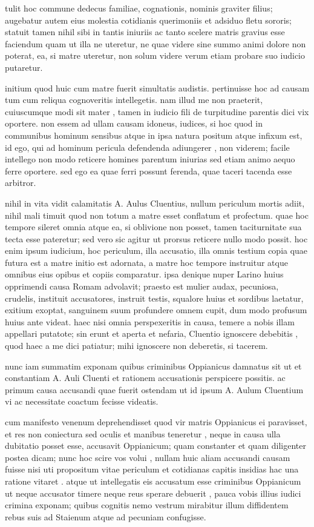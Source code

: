 tulit hoc commune dedecus familiae, cognationis, nominis graviter filius; augebatur autem eius molestia cotidianis querimoniis et adsiduo fletu sororis; statuit tamen nihil sibi in tantis iniuriis ac tanto scelere matris gravius esse faciendum quam ut illa ne uteretur, ne quae videre sine summo animi dolore non poterat, ea, si matre uteretur, non solum videre verum etiam probare suo iudicio putaretur.

 initium quod huic cum matre fuerit simultatis audistis. pertinuisse hoc ad causam tum cum reliqua cognoveritis intellegetis. nam illud me non praeterit, cuiuscumque modi sit mater , tamen in iudicio fili de turpitudine parentis dici vix oportere. non essem ad ullam causam idoneus, iudices, si hoc quod in communibus hominum sensibus atque in ipsa natura positum atque infixum est, id ego, qui ad hominum pericula defendenda adiungerer , non viderem; facile intellego non modo reticere homines parentum iniurias sed etiam animo aequo ferre oportere. sed ego ea quae ferri possunt ferenda, quae taceri tacenda esse arbitror.

 nihil in vita vidit calamitatis A. Aulus Cluentius, nullum periculum mortis adiit, nihil mali timuit quod non totum a matre esset conflatum et profectum. quae hoc tempore sileret omnia atque ea, si oblivione non posset, tamen taciturnitate sua tecta esse pateretur; sed vero sic agitur ut prorsus reticere nullo modo possit. hoc enim ipsum iudicium, hoc periculum, illa accusatio, illa omnis testium copia quae futura est a matre initio est adornata, a matre hoc tempore instruitur atque omnibus eius opibus et copiis comparatur. ipsa denique nuper Larino huius opprimendi causa Romam advolavit; praesto est mulier audax, pecuniosa, crudelis, instituit accusatores, instruit testis, squalore huius et sordibus laetatur, exitium exoptat, sanguinem suum profundere omnem cupit, dum modo profusum huius ante videat. haec nisi omnia perspexeritis in causa, temere a nobis illam appellari putatote; sin erunt et aperta et nefaria, Cluentio ignoscere debebitis , quod haec a me dici patiatur; mihi ignoscere non deberetis, si tacerem.

 nunc iam summatim exponam quibus criminibus Oppianicus damnatus sit ut et constantiam A. Auli Cluenti et rationem accusationis perspicere possitis. ac primum causa accusandi quae fuerit ostendam ut id ipsum A. Aulum Cluentium vi ac necessitate coactum fecisse videatis.

 cum manifesto venenum deprehendisset quod vir matris Oppianicus ei paravisset, et res non coniectura sed oculis et manibus teneretur , neque in causa ulla dubitatio posset esse, accusavit Oppianicum; quam constanter et quam diligenter postea dicam; nunc hoc scire vos volui , nullam huic aliam accusandi causam fuisse nisi uti propositum vitae periculum et cotidianas capitis insidias hac una ratione vitaret . atque ut intellegatis eis accusatum esse criminibus Oppianicum ut neque accusator timere neque reus sperare debuerit , pauca vobis illius iudici crimina exponam; quibus cognitis nemo vestrum mirabitur illum diffidentem rebus suis ad Staienum atque ad pecuniam confugisse.

